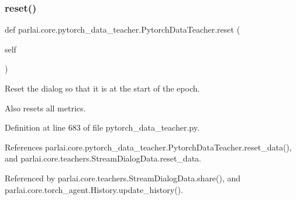 \subsubsection{\texorpdfstring{reset()}{reset()}}
{\footnotesize\ttfamily def parlai.\+core.\+pytorch\+\_\+data\+\_\+teacher.\+Pytorch\+Data\+Teacher.\+reset (\begin{DoxyParamCaption}\item[{}]{self }\end{DoxyParamCaption})}

\begin{DoxyVerb}Reset the dialog so that it is at the start of the epoch.

Also resets all metrics.
\end{DoxyVerb}
 

Definition at line 683 of file pytorch\+\_\+data\+\_\+teacher.\+py.



References parlai.\+core.\+pytorch\+\_\+data\+\_\+teacher.\+Pytorch\+Data\+Teacher.\+reset\+\_\+data(), and parlai.\+core.\+teachers.\+Stream\+Dialog\+Data.\+reset\+\_\+data.



Referenced by parlai.\+core.\+teachers.\+Stream\+Dialog\+Data.\+share(), and parlai.\+core.\+torch\+\_\+agent.\+History.\+update\+\_\+history().

